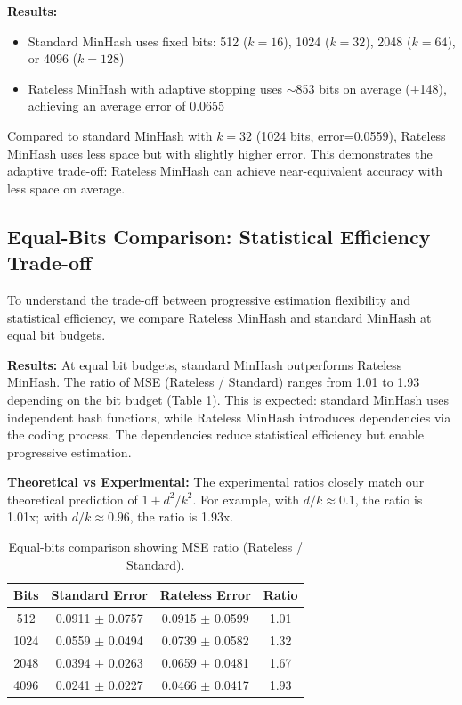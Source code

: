 \documentclass[11pt,letterpaper]{article}
\begin{document}
\textbf{Results:}
\begin{itemize}
    \item Standard MinHash uses fixed bits: 512 ($k=16$), 1024 ($k=32$), 2048 ($k=64$), or 4096 ($k=128$)
    \item Rateless MinHash with adaptive stopping uses $\sim$853 bits on average ($\pm$148), achieving an average error of 0.0655
\end{itemize}

Compared to standard MinHash with $k=32$ (1024 bits, error=0.0559), Rateless MinHash uses less space but with slightly higher error. This demonstrates the adaptive trade-off: Rateless MinHash can achieve near-equivalent accuracy with less space on average.

\subsection{Equal-Bits Comparison: Statistical Efficiency Trade-off}

To understand the trade-off between progressive estimation flexibility and statistical efficiency, we compare Rateless MinHash and standard MinHash at equal bit budgets.

\textbf{Results:} At equal bit budgets, standard MinHash outperforms Rateless MinHash. The ratio of MSE (Rateless / Standard) ranges from 1.01 to 1.93 depending on the bit budget (Table \ref{tab:equal_bits}). This is expected: standard MinHash uses independent hash functions, while Rateless MinHash introduces dependencies via the coding process. The dependencies reduce statistical efficiency but enable progressive estimation.

\textbf{Theoretical vs Experimental:} The experimental ratios closely match our theoretical prediction of $1 + d^2/k^2$. For example, with $d/k \approx 0.1$, the ratio is 1.01x; with $d/k \approx 0.96$, the ratio is 1.93x.

\begin{table}[!htbp]
\centering
\caption{Equal-bits comparison showing MSE ratio (Rateless / Standard).}
\label{tab:equal_bits}
\begin{tabular}{cccc}
\hline
\textbf{Bits} & \textbf{Standard Error} & \textbf{Rateless Error} & \textbf{Ratio} \\
\hline
512   & 0.0911 $\pm$ 0.0757 & 0.0915 $\pm$ 0.0599 & 1.01  \\
1024  & 0.0559 $\pm$ 0.0494 & 0.0739 $\pm$ 0.0582 & 1.32  \\
2048  & 0.0394 $\pm$ 0.0263 & 0.0659 $\pm$ 0.0481 & 1.67  \\
4096  & 0.0241 $\pm$ 0.0227 & 0.0466 $\pm$ 0.0417 & 1.93  \\
\hline
\end{tabular}
\end{table}
\end{document}
